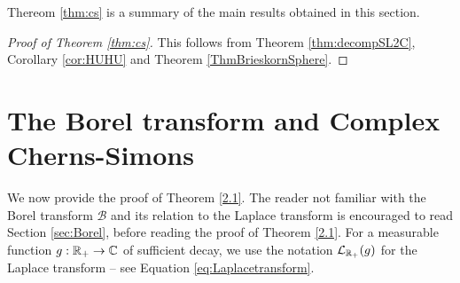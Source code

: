 Thereom \ref{thm:cs}  is a summary of the main results obtained in this section.

\begin{proof}[Proof of Theorem \ref{thm:cs}]
This follows from Theorem 	\ref{thm:decompSL2C}, Corollary \ref{cor:HUHU} and Theorem  \ref{ThmBrieskornSphere}.
\end{proof}

\section{The Borel transform and Complex Cherns-Simons} \label{sec:BOREL}

We now provide the proof of Theorem \ref{2.1}. The reader not familiar with the Borel transform $\mathcal{B}$ and its relation to the Laplace transform is encouraged to read Section \ref{sec:Borel}, before reading the proof of Theorem \ref{2.1}. For a measurable function $g:\mathbb{R}_+ \rightarrow \mathbb{C}$  of sufficient decay, we use the notation $\mathcal{L}_{\mathbb{R}_+}(g)$ for the Laplace transform -- see  Equation  \eqref{eq:Laplacetransform}.

